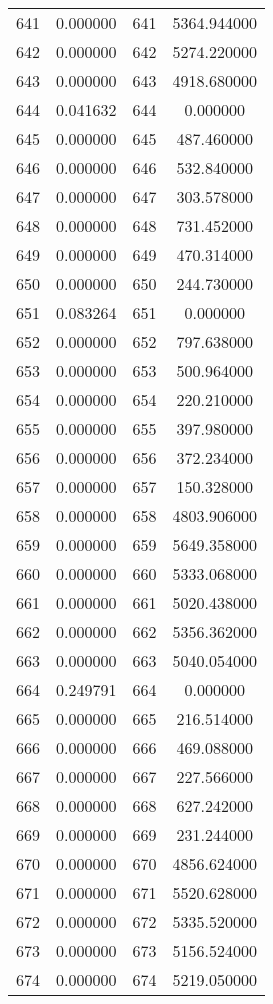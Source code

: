 \documentclass[12pt]{article}
\begin{document}
\begin{longtable}{@{}cccc@{}}
641 & 0.000000 & 641 & 5364.944000 \\
642 & 0.000000 & 642 & 5274.220000 \\
643 & 0.000000 & 643 & 4918.680000 \\
644 & 0.041632 & 644 & 0.000000 \\
645 & 0.000000 & 645 & 487.460000 \\
646 & 0.000000 & 646 & 532.840000 \\
647 & 0.000000 & 647 & 303.578000 \\
648 & 0.000000 & 648 & 731.452000 \\
649 & 0.000000 & 649 & 470.314000 \\
650 & 0.000000 & 650 & 244.730000 \\
651 & 0.083264 & 651 & 0.000000 \\
652 & 0.000000 & 652 & 797.638000 \\
653 & 0.000000 & 653 & 500.964000 \\
654 & 0.000000 & 654 & 220.210000 \\
655 & 0.000000 & 655 & 397.980000 \\
656 & 0.000000 & 656 & 372.234000 \\
657 & 0.000000 & 657 & 150.328000 \\
658 & 0.000000 & 658 & 4803.906000 \\
659 & 0.000000 & 659 & 5649.358000 \\
660 & 0.000000 & 660 & 5333.068000 \\
661 & 0.000000 & 661 & 5020.438000 \\
662 & 0.000000 & 662 & 5356.362000 \\
663 & 0.000000 & 663 & 5040.054000 \\
664 & 0.249791 & 664 & 0.000000 \\
665 & 0.000000 & 665 & 216.514000 \\
666 & 0.000000 & 666 & 469.088000 \\
667 & 0.000000 & 667 & 227.566000 \\
668 & 0.000000 & 668 & 627.242000 \\
669 & 0.000000 & 669 & 231.244000 \\
670 & 0.000000 & 670 & 4856.624000 \\
671 & 0.000000 & 671 & 5520.628000 \\
672 & 0.000000 & 672 & 5335.520000 \\
673 & 0.000000 & 673 & 5156.524000 \\
674 & 0.000000 & 674 & 5219.050000 \\

\end{longtable}
\end{document}

